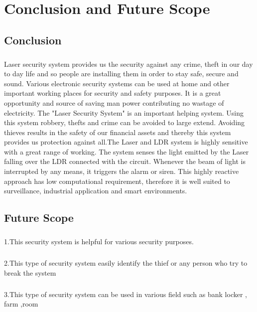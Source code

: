 \chapter{Conclusion and Future Scope}
\section{Conclusion}


\paragraph{}Laser security system provides us the security against any crime, theft in our day to day life and so people are installing them in order to stay safe, secure and sound. Various electronic security systems can be used at home and other important working places for security and safety purposes. It is a great opportunity and source of saving man power contributing no wastage of electricity. The "Laser Security System" is an important helping system. Using this system robbery, thefts and crime can be avoided to large extend. Avoiding thieves results in the safety of our financial assets and thereby this system provides us protection against all.The Laser and LDR system is highly sensitive with a great range of working. The system senses  the  light  emitted  by  the  Laser  falling  over  the  LDR  connected  with  the  circuit. Whenever the beam of light is interrupted by any means, it triggers the alarm or siren. This highly reactive approach has low computational requirement, therefore it is well suited to surveillance, industrial application and smart environments.
\section{Future Scope}
\paragraph{}1.This security system is helpful for various security purposes.
\paragraph{}2.This type of security system easily identify the  thief or any person who try to break the system
\paragraph{}3.This type of security system can be used in various field such as bank locker , farm ,room
